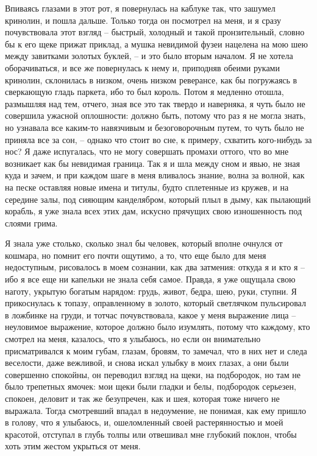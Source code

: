Впиваясь  глазами в этот рот, я повернулась на каблуке так, что зашумел
кринолин, и пошла дальше. Только тогда он  посмотрел  на  меня,  и  я  сразу
почувствовала этот взгляд -- быстрый, холодный и такой пронзительный, словно
бы  к  его  щеке прижат приклад, а мушка невидимой фузеи нацелена на мою шею
между завитками золотых буклей, -- и это было вторым началом.  Я  не  хотела
оборачиваться,  и  все  же  повернулась  к  нему  и, приподняв обеими руками
кринолин, склонилась в низком, очень низком реверансе, как бы  погружаясь  в
сверкающую  гладь  паркета,  ибо  то  был  король.  Потом я медленно отошла,
размышляя над тем, отчего, зная все это так твердо и наверняка, я чуть  было
не  совершила  ужасной  оплошности:  должно  быть, потому что раз я не могла
знать, но узнавала все каким-то навязчивым и безоговорочным путем,  то  чуть
было  не приняла все за сон, -- однако что стоит во сне, к примеру, схватить
кого-нибудь за нос? Я даже испугалась, что не могу совершать промахи оттого,
что во мне возникает как бы невидимая граница. Так я  и  шла  между  сном  и
явью, не зная куда и зачем, и при каждом шаге в меня вливалось знание, волна
за  волной,  как на песке оставляя новые имена и титулы, будто сплетенные из
кружев, и на середине залы, под сияющим канделябром, который  плыл  в  дыму,
как  пылающий  корабль,  я  уже  знала  всех этих дам, искусно прячущих свою
изношенность под слоями грима.

Я знала уже столько, сколько знал бы человек, который вполне очнулся от
кошмара, но  помнит  его  почти  ощутимо,  а  то,  что  еще  было  для  меня
недоступным,  рисовалось в моем сознании, как два затмения: откуда я и кто я
-- ибо я все еще ни капельки не знала себя самое. Правда, я уже ощущала свою
наготу, укрытую богатым нарядом: грудь, живот, бедра, шею, руки,  ступни.  Я
прикоснулась к топазу, оправленному в золото, который светлячком пульсировал
в  ложбинке на груди, и тотчас почувствовала, какое у меня выражение лица --
неуловимое выражение, которое должно было изумлять, потому что каждому,  кто
смотрел   на  меня,  казалось,  что  я  улыбаюсь,  но  если  он  внимательно
присматривался к моим губам, глазам, бровям, то замечал, что  в  них  нет  и
следа  веселости,  даже  вежливой, и снова искал улыбку в моих глазах, а они
были совершенно спокойны, он переводил взгляд на щеки, на подбородок, но там
не было трепетных ямочек: мои щеки были гладки и белы, подбородок  серьезен,
спокоен,  деловит  и  так  же  безупречен, как и шея, которая тоже ничего не
выражала. Тогда смотревший впадал в недоумение, не понимая, как ему пришло в
голову,  что  я  улыбаюсь,  и,  ошеломленный  своей  растерянностью  и  моей
красотой,  отступал  в  глубь толпы или отвешивал мне глубокий поклон, чтобы
хоть этим жестом укрыться от меня.

